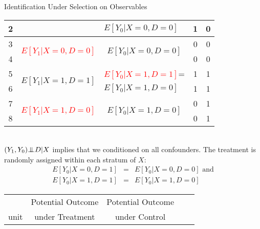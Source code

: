 \documentclass{beamer}
\numberwithin{equation}{section}
\newcommand{\indep}{{\bot\negthickspace\negthickspace\bot}}
\begin{document}
\begin{frame}{Identification Under Selection on Observables}
\begin{overprint}
\begin{small}
\begin{tabular}{c|c|c|c|c}
         2 & \multicolumn{ 1}{c|}{} & \multicolumn{ 1}{l|}{$E[Y_0|X=0,D=0]$} &                    1 &          0 \\
\hline
         3 & \multirow{2}{*}{\textcolor{red}{$E[Y_1|X=0,D=0]$}} & \multirow{2}{*}{$E[Y_0|X=0,D=0]$ } &                   0 &          0 \\
         4 & \multicolumn{ 1}{c|}{} & \multicolumn{ 1}{c|}{} &                    0 &          0 \\
\hline
         5 & \multirow{2}{*}{$E[Y_1|X=1,D=1]$ } & \multicolumn{ 1}{c|}{\textcolor{red}{$E[Y_0|X=1,D=1]$}=} &                    1 &          1 \\
         6 & \multicolumn{ 1}{c|}{} & \multicolumn{ 1}{l|}{$E[Y_0|X=1,D=0]$} &                    1 &          1 \\
\hline
         7 & \multirow{2}{*}{\textcolor{red}{$E[Y_1|X=1,D=0]$}} & \multirow{2}{*}{$E[Y_0|X=1,D=0]$} &                    0 &          1 \\
         8 & \multicolumn{ 1}{c|}{} & \multicolumn{ 1}{c|}{} &                   0 &          1 \\
\hline
\end{tabular}
\end{small}\bigskip\\
$(Y_1,Y_0) \indep D |X$ implies that we conditioned on all confounders. The treatment is randomly assigned within each stratum of $X$:\vspace{-.1in}
\begin{eqnarray}
E[Y_0|X=0,D=1] &=& E[Y_0|X=0,D=0]\,\, \mbox{and}\nonumber\\
 E[Y_0|X=1,D=1] &=& E[Y_0|X=1,D=0]\nonumber
\end{eqnarray}
\begin{small}
\begin{tabular}{c|c|c|c|c}
 &Potential Outcome & Potential Outcome &   & \\
unit &under Treatment  & under Control &   &  \\


\end{tabular}
\end{small}
\end{overprint}
\end{frame}
\end{document}

